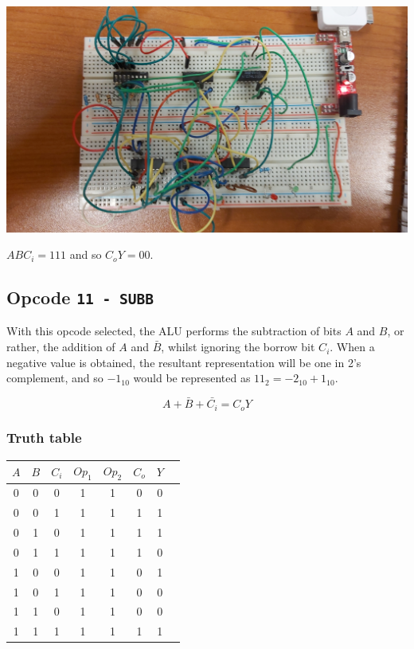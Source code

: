 \documentclass{article}
\begin{document}
\vspace{2em}

\includegraphics[angle=180, width=\textwidth]{./figures/11110.jpg}
\begin{center}
	$ABC_i = 111$ and so $C_o Y= 00$.
\end{center}


\subsection{Opcode \texttt{11 - SUBB}}

With this opcode selected, the ALU performs the subtraction of bits $A$ and $B$, or rather, the
addition of $A$ and $\bar{B}$, whilst ignoring the borrow bit $C_{i}$. When a negative value is
obtained, the resultant representation will be one in 2's complement, and so $-1_{10}$ would be
represented as $11_2 = -2_{10} + 1_{10}$.

\[A+\bar{B}+\bar{C_i} = C_o Y\]

\vspace{9em}

\subsubsection{Truth table}

\begin{center}
	\Large
	\begin{tabular}{c|c|c||c|c||c|c|c}
		$A$ & $B$ & $C_i$ & $Op_1$ & $Op_2$ & $C_{o}$ & $Y$ \\
		\hline
		0 & 0 & 0 & 1 & 1 & 0 & 0 \\
		0 & 0 & 1 & 1 & 1 & 1 & 1 \\%
		0 & 1 & 0 & 1 & 1 & 1 & 1 \\%
		0 & 1 & 1 & 1 & 1 & 1 & 0 \\%
		1 & 0 & 0 & 1 & 1 & 0 & 1 \\
		1 & 0 & 1 & 1 & 1 & 0 & 0 \\
		1 & 1 & 0 & 1 & 1 & 0 & 0 \\
		1 & 1 & 1 & 1 & 1 & 1 & 1 \\ %
	\end{tabular}
\end{center}
\end{document}
